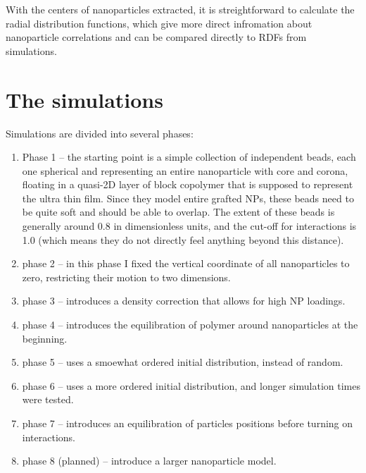 With the centers of nanoparticles extracted, it is streightforward to calculate the radial distribution functions, which give more direct infromation about nanoparticle correlations and can be compared directly to RDFs from simulations.

\section{The simulations}

Simulations are divided into several phases:
\begin{enumerate}
\item Phase 1 -- the starting point is a simple collection of independent beads, each one spherical and representing an entire nanoparticle with core and corona, floating in a quasi-2D layer of block copolymer that is supposed to represent the ultra thin film. Since they model entire grafted NPs, these beads need to be quite soft and should be able to overlap. The extent of these beads is generally around 0.8 in dimensionless units, and the cut-off for interactions is 1.0 (which means they do not directly feel anything beyond this distance).
\item phase 2 -- in this phase I fixed the vertical coordinate of all nanoparticles to zero, restricting their motion to two dimensions.
\item phase 3 -- introduces a density correction that allows for high NP loadings.
\item phase 4 -- introduces the equilibration of polymer around nanoparticles at the beginning.
\item phase 5 -- uses a smoewhat ordered initial distribution, instead of random.
\item phase 6 -- uses a more ordered initial distribution, and longer simulation times were tested.
\item phase 7 -- introduces an equilibration of particles positions before turning on interactions.
\item phase 8 (planned) -- introduce a larger nanoparticle model.
\end{enumerate}
